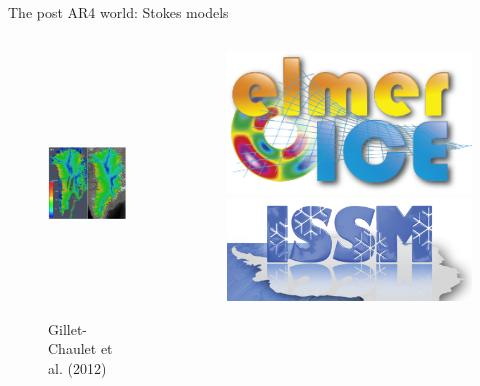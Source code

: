 \documentclass[hide notes,intlimits]{beamer}
\begin{document}
\begin{frame}{The post AR4 world: Stokes models}
  \begin{columns}[c]
    \begin{column}{.6\linewidth}
    \begin{figure}
      \includegraphics[height=7cm]{gillet-chaulet_2012_fig_1}
      \\ \tiny{Gillet-Chaulet et al. (2012)}
    \end{figure}
    \end{column}
    \begin{column}{.4\linewidth}
      \begin{figure}
        \includegraphics[width=.75\textwidth]{elmer}
        \includegraphics[width=.75\textwidth]{issm}
      \end{figure}
    \end{column}
  \end{columns}

\end{frame}
\end{document}
